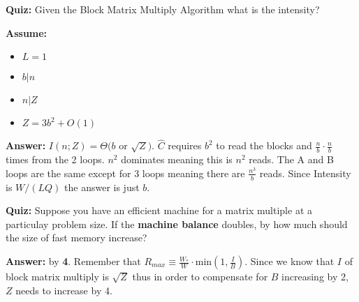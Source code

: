 \documentclass[../main.tex]{subfiles}
\begin{document}
	\begin{mdframed}[style=Quiz]
		\textbf{Quiz:} Given the Block Matrix Multiply Algorithm what is the intensity?
		
		\noindent
		\textbf{Assume:}
		\begin{itemize}
			\item $L = 1$
			\item $b | n$
			\item $n | Z$
			\item $Z=3b^2 + O(1)$
		\end{itemize}
		
		\noindent
		\textbf{Answer:} $I(n;Z) = \Theta(b$ or $\sqrt{Z})$. $\hat{C}$ requires $b^2$ to read the blocks and $\frac{n}{b} \cdot \frac{n}{b}$ times from the 2 loops. $n^2$ dominates meaning this is $n^2$ reads. The A and B loops are the same except for 3 loops meaning there are $\frac{n^3}{b}$ reads. Since Intensity is $W/(LQ)$ the answer is just $b$.
	\end{mdframed}
	\begin{mdframed}[style=Quiz]
		\textbf{Quiz: } Suppose you have an efficient machine for a matrix multiple at a particulay problem size. If the \textbf{machine balance} doubles, by how much should the size of fast memory increase?
		
		
		\noindent
		\textbf{Answer: } by \textbf{4}. Remember that  $R_{max} \equiv \frac{W_*}{W} \cdot$min$(1,\frac{I}{B})$. Since we know that $I$ of block matrix multiply is $\sqrt{Z}$ thus in order to compensate for $B$ increasing by 2, $Z$ needs to increase by 4.
	\end{mdframed}
\end{document}
